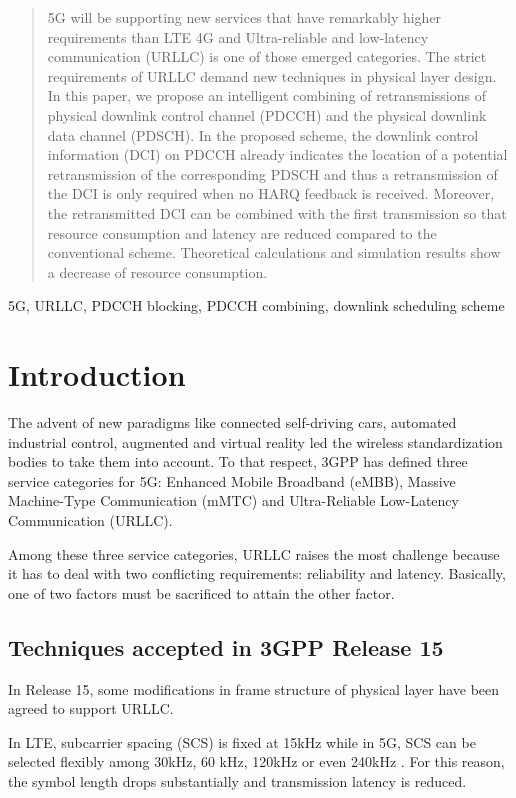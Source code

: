 \documentclass[conference,10pt]{IEEEtran}
\begin{document}
\begin{abstract}
5G will be supporting new services that have remarkably higher requirements than LTE 4G and Ultra-reliable and low-latency communication (URLLC) is one of those emerged categories. The strict requirements of URLLC demand new techniques in physical layer design. In this paper, we propose an intelligent combining of retransmissions of physical downlink control channel (PDCCH) and the physical downlink data channel (PDSCH). In the proposed scheme, the downlink control information (DCI) on PDCCH already indicates the location of a potential retransmission of the corresponding PDSCH and thus a retransmission of the DCI is only required when no HARQ feedback is received. Moreover, the retransmitted DCI can be combined with the first transmission so that resource consumption and latency are reduced compared to the conventional scheme. Theoretical calculations and simulation results show a decrease of resource consumption.
\end{abstract}

\begin{IEEEkeywords}
5G, URLLC, PDCCH blocking, PDCCH combining, downlink scheduling scheme 
\end{IEEEkeywords}

\section{Introduction}
The advent of new paradigms like connected self-driving cars, automated industrial control, augmented and virtual reality led the wireless standardization bodies to take them into account. To that respect, 3GPP has defined three service categories for 5G: Enhanced Mobile Broadband (eMBB), Massive Machine-Type Communication (mMTC) and Ultra-Reliable Low-Latency Communication (URLLC). 

Among these three service categories, URLLC raises the most challenge because it has to deal with two conflicting requirements: reliability and latency. Basically, one of two factors must be sacrificed to attain the other factor. 

\subsection{Techniques accepted in 3GPP Release 15}\label{IAA}
In Release 15, some modifications in frame structure of physical layer have been agreed to support URLLC. 

In LTE, subcarrier spacing (SCS) is fixed at 15kHz while in 5G, SCS can be selected flexibly among 30kHz, 60 kHz, 120kHz or even 240kHz \cite{ad2}. For this reason, the symbol length drops substantially and transmission latency is reduced.
\end{document}
